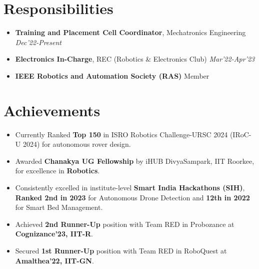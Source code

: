 \documentclass[letterpaper,11pt]{article}
\begin{document}
\section{Responsibilities}
\begin{itemize}[leftmargin=0.5cm, noitemsep]
\item \textbf{Training and Placement Cell Coordinator}, Mechatronics Engineering \hfill \textit{Dec'22-Present}
\item \textbf{Electronics In-Charge}, REC (Robotics \& Electronics Club) \hfill \textit{Mar'22-Apr'23}
\item \textbf{IEEE Robotics and Automation Society (RAS)} Member
\end{itemize}

\section{Achievements}
\begin{itemize}[leftmargin=0.5cm, noitemsep]
\item Currently Ranked \textbf{Top 150} in ISRO Robotics Challenge-URSC 2024 (IRoC-U 2024) for autonomous rover design.
\item Awarded \textbf{Chanakya UG Fellowship} by iHUB DivyaSampark, IIT Roorkee, for excellence in \textbf{Robotics}.
\item Consistently excelled in institute-level \textbf{Smart India Hackathons (SIH)}, \\ \textbf{Ranked 2nd in 2023} for Autonomous Drone Detection and \textbf{12th in 2022} for Smart Bed Management.
\item Achieved \textbf{2nd Runner-Up} position with Team RED in Probozance at \textbf{Cognizance’23, IIT-R}.
\item Secured \textbf{1st Runner-Up} position with Team RED in RoboQuest at \textbf{Amalthea’22, IIT-GN}.
\end{itemize}
\end{document}
